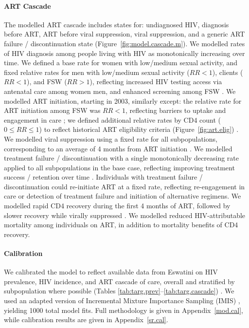 \paragraph{ART Cascade}
The modelled ART cascade includes states for:
undiagnosed HIV, diagnosis before ART, ART before viral suppression, viral suppression,
and a generic ART failure / discontinuation state
(Figure~\ref{fig:model.cascade.m}).
We modelled rates of HIV diagnosis among people living with HIV
as monotonically increasing over time.
We defined a base rate for women with low/medium sexual activity,
and fixed relative rates for
men with low/medium sexual activity ($RR < 1$), clients ($RR < 1$), and FSW ($RR > 1$),
reflecting increased HIV testing access via antenatal care among women \vs men,
and enhanced screening among FSW \cite{Baral2014}.
We modelled ART initiation, starting in 2003, similarly except:
the relative rate for ART initiation among FSW was $RR < 1$,
reflecting barriers to uptake and engagement in care \cite{Lancaster2016sr};
we defined additional relative rates by CD4 count ($0 \le RR \le 1$)
to reflect historical ART eligibility criteria (Figure~\ref{fig:art.elig}) \cite{SHIMS2}.
We modelled viral suppression using a fixed rate for all subpopulations,
corresponding to an average of 4 months from ART initiation \cite{Mujugira2016}.
We modelled treatment failure / discontinuation with a single monotonically decreasing rate
applied to all subpopulations in the base case,
reflecting improving treatment success / retention over time \cite{SHIMS2}.
Individuals with treatment failure / discontinuation could re-initiate ART at a fixed rate,
reflecting re-engagement in care or
detection of treatment failure and initiation of alternative regimens.
We modelled rapid CD4 recovery during the first 4 months of ART,
followed by slower recovery while virally suppressed \cite{Gabillard2013}.
We modelled reduced HIV-attributable mortality among individuals on ART,
in addition to mortality benefits of CD4 recovery.
\paragraph{Calibration}
We calibrated the model to reflect
available data from Eswatini on HIV prevalence, HIV incidence, and ART cascade of care,
overall and stratified by subpopulation where possible
(Tables \ref{tab:targ.prev}--\ref{tab:targ.cascade})
\cite{SDHS2006,SHIMS1,SHIMS2,SHIMS3,Baral2014,EswKP2014,EswIBBS2022}.
We used an adapted version of Incremental Mixture Importance Sampling (IMIS) \cite{Raftery2010},
yielding 1000 total model fits.
Full methodology is given in Appendix~\ref{mod.cal},
while calibration results are given in Appendix~\ref{sr.cal}.
